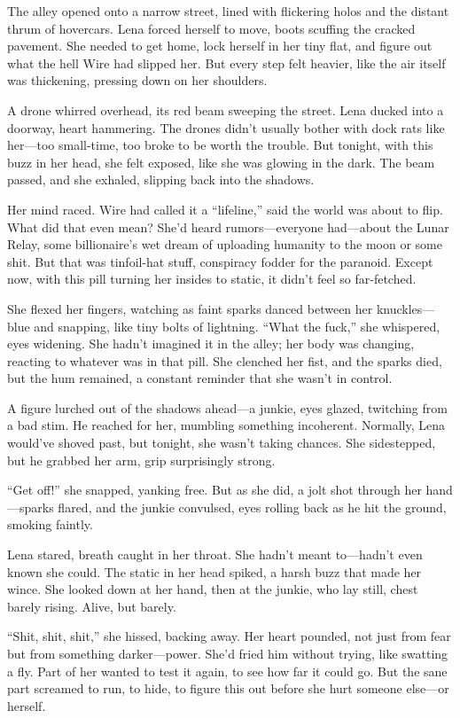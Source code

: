 \documentclass[12pt]{book}
\begin{document}
The alley opened onto a narrow street, lined with flickering holos and the distant thrum of hovercars. Lena forced herself to move, boots scuffing the cracked pavement. She needed to get home, lock herself in her tiny flat, and figure out what the hell Wire had slipped her. But every step felt heavier, like the air itself was thickening, pressing down on her shoulders.

A drone whirred overhead, its red beam sweeping the street. Lena ducked into a doorway, heart hammering. The drones didn’t usually bother with dock rats like her---too small-time, too broke to be worth the trouble. But tonight, with this buzz in her head, she felt exposed, like she was glowing in the dark. The beam passed, and she exhaled, slipping back into the shadows.

Her mind raced. Wire had called it a ``lifeline,'' said the world was about to flip. What did that even mean? She’d heard rumors---everyone had---about the Lunar Relay, some billionaire’s wet dream of uploading humanity to the moon or some shit. But that was tinfoil-hat stuff, conspiracy fodder for the paranoid. Except now, with this pill turning her insides to static, it didn’t feel so far-fetched.

She flexed her fingers, watching as faint sparks danced between her knuckles---blue and snapping, like tiny bolts of lightning. ``What the fuck,'' she whispered, eyes widening. She hadn’t imagined it in the alley; her body was changing, reacting to whatever was in that pill. She clenched her fist, and the sparks died, but the hum remained, a constant reminder that she wasn’t in control.

A figure lurched out of the shadows ahead---a junkie, eyes glazed, twitching from a bad stim. He reached for her, mumbling something incoherent. Normally, Lena would’ve shoved past, but tonight, she wasn’t taking chances. She sidestepped, but he grabbed her arm, grip surprisingly strong.

``Get off!'' she snapped, yanking free. But as she did, a jolt shot through her hand---sparks flared, and the junkie convulsed, eyes rolling back as he hit the ground, smoking faintly.

Lena stared, breath caught in her throat. She hadn’t meant to---hadn’t even known she could. The static in her head spiked, a harsh buzz that made her wince. She looked down at her hand, then at the junkie, who lay still, chest barely rising. Alive, but barely.

``Shit, shit, shit,'' she hissed, backing away. Her heart pounded, not just from fear but from something darker---power. She’d fried him without trying, like swatting a fly. Part of her wanted to test it again, to see how far it could go. But the sane part screamed to run, to hide, to figure this out before she hurt someone else---or herself.
\end{document}
